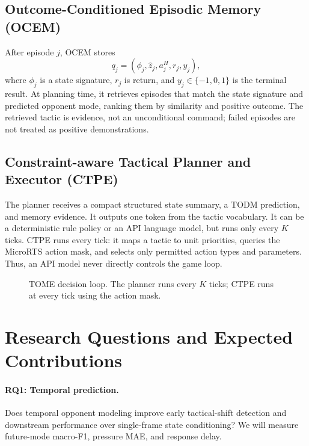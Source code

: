 \documentclass[11pt]{article}
\begin{document}
\subsection{Outcome-Conditioned Episodic Memory (OCEM)}

After episode $j$, OCEM stores
\[
q_j=(\phi_j,\hat z_j,a^H_j,r_j,y_j),
\]
where $\phi_j$ is a state signature, $r_j$ is return, and $y_j \in\{-1,0,1\}$
is the terminal result. At planning time, it retrieves episodes that match the
state signature and predicted opponent mode, ranking them by similarity and
positive outcome. The retrieved tactic is evidence, not an unconditional
command; failed episodes are not treated as positive demonstrations.

\subsection{Constraint-aware Tactical Planner and Executor (CTPE)}

The planner receives a compact structured state summary, a TODM prediction, and
memory evidence. It outputs one token from the tactic vocabulary. It can be a
deterministic rule policy or an API language model, but runs only every $K$
ticks. CTPE runs every tick: it maps a tactic to unit priorities, queries the
MicroRTS action mask, and selects only permitted action types and parameters.
Thus, an API model never directly controls the game loop.

\begin{figure}[t]
\centering
{}
\caption{TOME decision loop. The planner runs every $K$ ticks; CTPE runs at
every tick using the action mask.}
\label{fig:tome}
\end{figure}

\section{Research Questions and Expected Contributions}

\paragraph{RQ1: Temporal prediction.} Does temporal opponent modeling improve
early tactical-shift detection and downstream performance over single-frame
state conditioning? We will measure future-mode macro-F1, pressure MAE, and
response delay.
\end{document}
